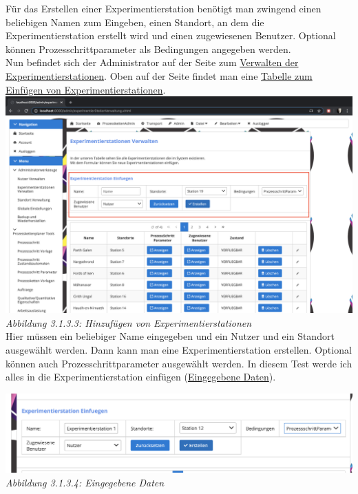 \documentclass[enabledeprecatedfontcommands,fontsize=12pt,paper=a4,twoside]{scrartcl}
\begin{document}
Für das Erstellen einer Experimentierstation benötigt man zwingend einen beliebigen Namen zum Eingeben, einen Standort, an dem die Experimentierstation erstellt wird und einen zugewiesenen Benutzer. Optional können Prozesschrittparameter als Bedingungen angegeben werden. \\

Nun befindet sich der Administrator auf der Seite zum \hyperlink{sc3.1.3.2}{Verwalten der Experimentierstationen}. Oben auf der Seite findet man eine \hyperlink{sc3.1.3.3}{Tabelle zum Einfügen von Experimentierstationen}. \\

\hypertarget{sc3.1.3.3}{
\includegraphics[width=1\textwidth]{Screenshots/3133.png}
\textit{Abbildung 3.1.3.3: Hinzufügen von Experimentierstationen}
} \\

Hier müssen ein beliebiger Name eingegeben und ein Nutzer und ein Standort ausgewählt werden. Dann kann man eine Experimentierstation erstellen. Optional können auch Prozesschrittparameter ausgewählt werden. In diesem Test werde ich alles in die Experimentierstation einfügen (\hyperlink{sc3.1.3.4}{Eingegebene Daten}). 

\hypertarget{sc3.1.3.4}{
\includegraphics[width=1\textwidth]{Screenshots/3134.png}
\textit{Abbildung 3.1.3.4: Eingegebene Daten}
} \\
\end{document}
